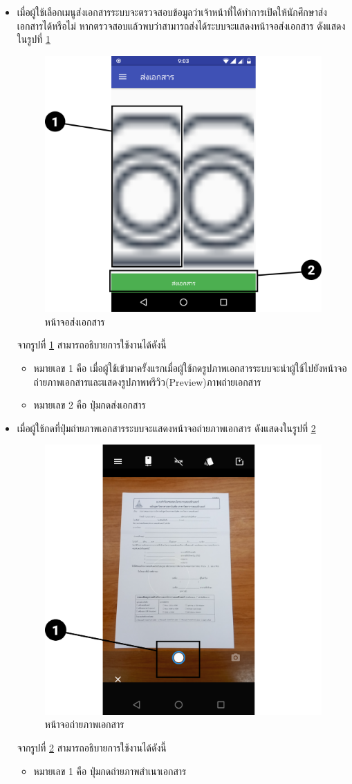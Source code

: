 \begin{enumerate}
\begin{itemize}
			\item เมื่อผู้ใช้เลือกเมนูส่งเอกสารระบบจะตรวจสอบข้อมูลว่าเจ้าหน้าที่ได้ทำการเปิดให้นักศึกษาส่งเอกสารได้หรือไม่ หากตรวจสอบแล้วพบว่าสามารถส่งได้ระบบจะแสดงหน้าจอส่งเอกสาร ดังแสดงในรูปที่ \ref{Fig:submit}
			\begin{figure}[H]
				\centering
				\includegraphics[width=0.5\columnwidth]{Figures/7/Manual/submit}
				\caption{หน้าจอส่งเอกสาร}
				\label{Fig:submit}
			\end{figure}
			จากรูปที่ \ref{Fig:submit} สามารถอธิบายการใช้งานได้ดังนี้
			\begin{itemize}[label={--}]
				\item หมายเลข 1 คือ เมื่อผู้ใช้เข้ามาครั้งแรกเมื่อผู้ใช้กดรูปภาพเอกสารระบบจะนำผู้ใช้ไปยังหน้าจอถ่ายภาพเอกสารและแสดงรูปภาพพรีวิว(Preview)ภาพถ่ายเอกสาร
				\item หมายเลข 2 คือ ปุ่มกดส่งเอกสาร
			\end{itemize}
		
			\item เมื่อผู้ใช้กดที่ปุ่มถ่ายภาพเอกสารระบบจะแสดงหน้าจอถ่ายภาพเอกสาร ดังแสดงในรูปที่ \ref{Fig:submit1}
			\begin{figure}[H]
				\centering
				\includegraphics[width=0.5\columnwidth]{Figures/7/Manual/submit1}
				\caption{หน้าจอถ่ายภาพเอกสาร}
				\label{Fig:submit1}
			\end{figure}
			จากรูปที่ \ref{Fig:submit1} สามารถอธิบายการใช้งานได้ดังนี้
			\begin{itemize}[label={--}]
				\item หมายเลข 1 คือ ปุ่มกดถ่ายภาพสำเนาเอกสาร
			\end{itemize}
		

\end{itemize}
\end{enumerate}
